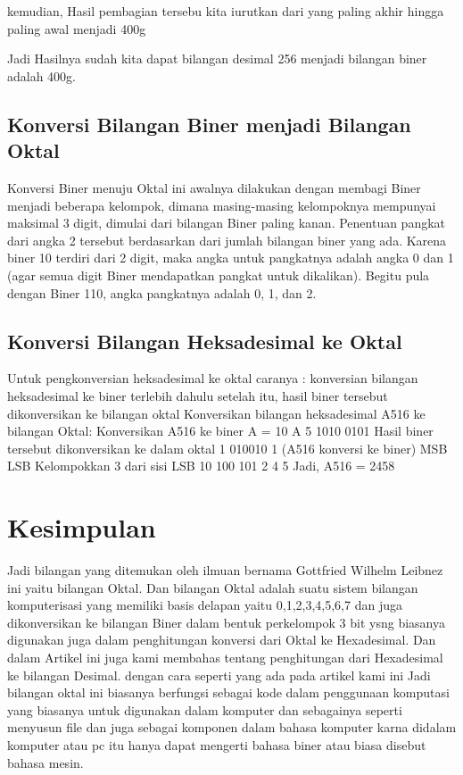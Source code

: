 	kemudian, Hasil pembagian tersebu kita iurutkan dari yang paling akhir hingga paling awal menjadi 400g

	Jadi Hasilnya sudah kita dapat bilangan desimal 256 menjadi bilangan biner adalah 400g.
	
	\subsection {Konversi Bilangan Biner menjadi Bilangan Oktal}
	Konversi Biner menuju Oktal ini awalnya dilakukan dengan membagi Biner menjadi beberapa kelompok, dimana masing-masing kelompoknya mempunyai maksimal 3 digit, dimulai dari bilangan Biner paling kanan.
	Penentuan pangkat dari angka 2 tersebut berdasarkan dari jumlah bilangan biner yang ada. Karena biner 10 terdiri dari 2 digit, maka angka untuk pangkatnya adalah angka 0 dan 1 (agar semua digit Biner mendapatkan pangkat untuk dikalikan). Begitu pula dengan Biner 110, angka pangkatnya adalah 0, 1, dan 2.

	\subsection {Konversi Bilangan Heksadesimal ke Oktal}
	Untuk pengkonversian heksadesimal
	ke oktal caranya :
	konversian bilangan heksadesimal ke biner terlebih dahulu
	setelah itu, hasil biner tersebut dikonversikan ke bilangan oktal
	Konversikan bilangan heksadesimal
	A516 ke bilangan Oktal:
	Konversikan A516 ke biner
 	A = 10
  	A        5               
       1010   0101 
	Hasil biner tersebut dikonversikan ke dalam oktal
  	1   010010  1 (A516 konversi ke biner)
 	MSB           LSB
	Kelompokkan 3 dari sisi LSB
 	10    100   101
         2        4       5
	Jadi, A516  =  2458

\section {Kesimpulan}

Jadi bilangan yang ditemukan oleh ilmuan bernama Gottfried Wilhelm Leibnez ini yaitu bilangan Oktal. Dan bilangan Oktal adalah suatu sistem bilangan komputerisasi yang memiliki basis delapan yaitu 0,1,2,3,4,5,6,7 dan juga dikonversikan ke bilangan Biner dalam bentuk perkelompok 3 bit ysng biasanya digunakan juga dalam penghitungan konversi dari Oktal ke Hexadesimal. Dan dalam Artikel ini juga kami membahas tentang penghitungan dari Hexadesimal ke bilangan Desimal. dengan cara seperti yang ada pada artikel kami ini
Jadi bilangan oktal ini biasanya berfungsi sebagai kode dalam penggunaan komputasi yang biasanya untuk digunakan dalam komputer dan sebagainya seperti menyusun file dan juga sebagai komponen dalam bahasa komputer karna didalam komputer atau pc itu hanya dapat mengerti bahasa biner atau biasa disebut bahasa mesin.